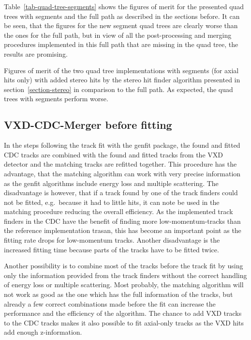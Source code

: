 Table~\ref{tab-quad-tree-segments} shows the figures of merit for the presented quad trees with segments and the full path as described in the sections before. It can be seen, that the figures for the new segment quad trees are clearly worse than the ones for the full path, but in view of all the post-processing and merging procedures implemented in this full path that are missing in the quad tree, the results are promising.

\begin{table}
  \caption{Figures of merit of the two quad tree implementations with segments (for axial hits only) with added stereo hits by the stereo hit finder algorithm presented in section~\ref{section-stereo} in comparison to the full path. As expected, the quad trees with segments perform worse.}
  \label{tab-quad-tree-segments}
\end{table}

\subsection{VXD-CDC-Merger before fitting}
In the steps following the track fit with the genfit package, the found and fitted CDC tracks are combined with the found and fitted tracks from the VXD detector and the matching tracks are refitted together. This procedure has the advantage, that the matching algorithm can work with very precise information as the genfit algorithms include energy loss and multiple scattering. The disadvantage is however, that if a track found by one of the track finders could not be fitted, e.g.\ because it had to little hits, it can note be used in the matching procedure reducing the overall efficiency. As the implemented track finders in the CDC have the benefit of finding more low-momentum-tracks than the reference implementation trasan, this has become an important point as the fitting rate drops for low-momentum tracks. Another disadvantage is the increased fitting time because parts of the tracks have to be fitted twice.

Another possibility is to combine most of the tracks before the track fit by using only the information provided from the track finders without the correct handling of energy loss or multiple scattering. Most probably, the matching algorithm will not work as good as the one which has the full information of the tracks, but already a few correct combinations made before the fit can increase the performance and the efficiency of the algorithm. The chance to add VXD tracks to the CDC tracks makes it also possible to fit axial-only tracks as the VXD hits add enough z-information. 

